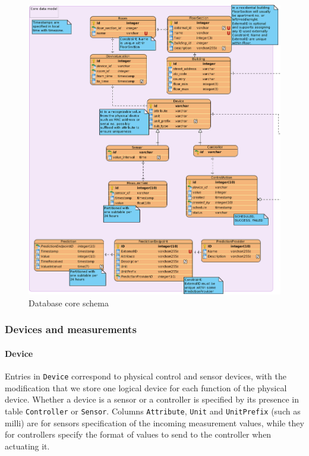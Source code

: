 \begin{figure}[H]
    \centering
    \includegraphics[width=\textwidth]{figures/db_core_schema}
    \caption{Database core schema}
    \label{figureDbCoreModel}
\end{figure}

\subsubsection{Devices and measurements}

\paragraph{Device} 
Entries in \texttt{Device} correspond to physical control and sensor devices, with the modification that we store one logical device for each function of the physical device. Whether a device is a sensor or a controller is specified by its presence in table \texttt{Controller} or \texttt{Sensor}. Columns \texttt{Attribute}, \texttt{Unit} and \texttt{UnitPrefix} (such as milli) are for sensors specification of the incoming measurement values, while they for controllers specify the format of values to send to the controller when actuating it.

